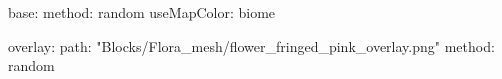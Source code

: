base:
  method: random
  useMapColor: biome
  
overlay:
  path: "Blocks/Flora_mesh/flower_fringed_pink_overlay.png"
  method: random